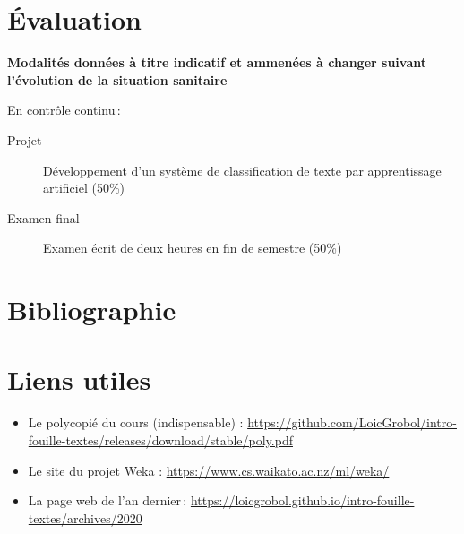 \documentclass[a4paper, 11pt]{article}
\begin{document}
\section*{Évaluation}

\textbf{Modalités données à titre indicatif et ammenées à changer suivant l'évolution de la situation sanitaire}

En contrôle continu :

\begin{description}
    \item[Projet] Développement d'un système de classification de texte par apprentissage artificiel (50\%)
    \item[Examen final] Examen écrit de deux heures en fin de semestre (50\%)
\end{description}

\section*{Bibliographie}
\printbibliography[heading=none]

\section*{Liens utiles}
\begin{itemize}
    \item Le polycopié du cours (indispensable) :  \url{https://github.com/LoicGrobol/intro-fouille-textes/releases/download/stable/poly.pdf}
    \item Le site du projet Weka : \url{https://www.cs.waikato.ac.nz/ml/weka/}
    \item La page web de l'an dernier : \url{https://loicgrobol.github.io/intro-fouille-textes/archives/2020}
\end{itemize}
\end{document}
